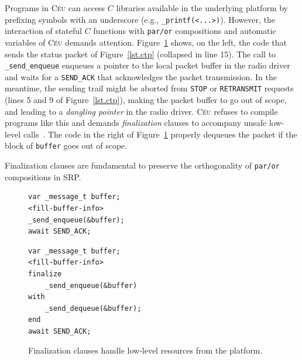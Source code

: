\documentclass{acm_proc_article-sp}
\newcommand{\CEU}{\textsc{C\'{e}u}\xspace}
\newcommand{\code}[1] {{\small{\texttt{#1}}}}
\newcommand{\1}{\;}
\newcommand{\2}{\;\;}
\newcommand{\3}{\;\;\;}
\newcommand{\5}{\;\;\;\;\;}
\begin{document}

Programs in \CEU can access $C$ libraries available in the underlying platform 
by prefixing symbols with an underscore (e.g., \code{\_printf(<...>)}).
%
However, the interaction of stateful $C$ functions with \code{par/or} 
compositions and automatic variables of \CEU demands attention.
%
Figure~\ref{lst.fin} shows, on the left, the code that sends the status packet 
of Figure~\ref{lst.ctp} (collapsed in line 15).
%
The call to \code{\_send\_enqueue} enqueues a pointer to the local packet 
buffer in the radio driver and waits for a \code{SEND\_ACK} that acknowledges
the packet transmission.
%
In the meantime, the sending trail might be aborted from \code{STOP} or 
\code{RETRANSMIT} requests (lines 5 and 9 of Figure~\ref{lst.ctp}), making the 
packet buffer to go out of scope, and leading to a \emph{dangling pointer} in 
the radio driver.
%
\CEU refuses to compile programs like this and demands \emph{finalization} 
clauses to accompany unsafe low-level calls~\cite{ceu.sensys13}.
The code in the right of Figure~\ref{lst.fin} properly dequeues the packet if
the block of \code{buffer} goes out of scope.

Finalization clauses are fundamental to preserve the orthogonality of 
\code{par/or} compositions in SRP.

\begin{figure}[t]
\begin{minipage}[t]{0.45\linewidth}
\begin{lstlisting}
var _message_t buffer;
<fill-buffer-info>
_send_enqueue(&buffer);
await SEND_ACK;
\end{lstlisting}
\end{minipage}
%
\begin{minipage}[t]{0.50\linewidth}
\begin{lstlisting}
var _message_t buffer;
<fill-buffer-info>
finalize
    _send_enqueue(&buffer)
with
    _send_dequeue(&buffer);
end
await SEND_ACK;
\end{lstlisting}
\end{minipage}
\caption{ Finalization clauses handle low-level resources from the platform.
\label{lst.fin}
}
\end{figure}

\end{document}
